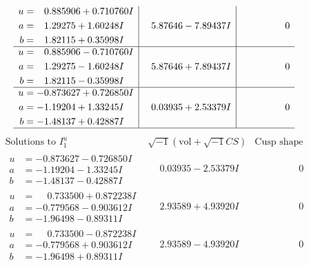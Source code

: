 \documentclass[1p]{elsarticle_modified}
\theoremstyle{definition}
\newcommand{\I}{\sqrt{-1}}
\begin{document}
$$\begin{array}{c|c|c}
\begin{aligned}
u &= \phantom{-}0.885906 + 0.710760 I \\
a &= \phantom{-}1.29275 + 1.60248 I \\
b &= \phantom{-}1.82115 + 0.35998 I\end{aligned}
 & \phantom{-}5.87646 - 7.89437 I & \phantom{-0.000000 } 0 \\ \hline\begin{aligned}
u &= \phantom{-}0.885906 - 0.710760 I \\
a &= \phantom{-}1.29275 - 1.60248 I \\
b &= \phantom{-}1.82115 - 0.35998 I\end{aligned}
 & \phantom{-}5.87646 + 7.89437 I & \phantom{-0.000000 } 0 \\ \hline\begin{aligned}
u &= -0.873627 + 0.726850 I \\
a &= -1.19204 + 1.33245 I \\
b &= -1.48137 + 0.42887 I\end{aligned}
 & \phantom{-}0.03935 + 2.53379 I & \phantom{-0.000000 } 0\\
 \hline 
 \end{array}$$\newpage$$\begin{array}{c|c|c}  
\text{Solutions to }I^u_{1}& \I (\text{vol} + \sqrt{-1}CS) & \text{Cusp shape}\\
 \hline 
\begin{aligned}
u &= -0.873627 - 0.726850 I \\
a &= -1.19204 - 1.33245 I \\
b &= -1.48137 - 0.42887 I\end{aligned}
 & \phantom{-}0.03935 - 2.53379 I & \phantom{-0.000000 } 0 \\ \hline\begin{aligned}
u &= \phantom{-}0.733500 + 0.872238 I \\
a &= -0.779568 - 0.903612 I \\
b &= -1.96498 - 0.89311 I\end{aligned}
 & \phantom{-}2.93589 + 4.93920 I & \phantom{-0.000000 } 0 \\ \hline\begin{aligned}
u &= \phantom{-}0.733500 - 0.872238 I \\
a &= -0.779568 + 0.903612 I \\
b &= -1.96498 + 0.89311 I\end{aligned}
 & \phantom{-}2.93589 - 4.93920 I & \phantom{-0.000000 } 0 \\ \hline\begin{aligned}

\end{aligned}
\end{array}$$
\end{document}
